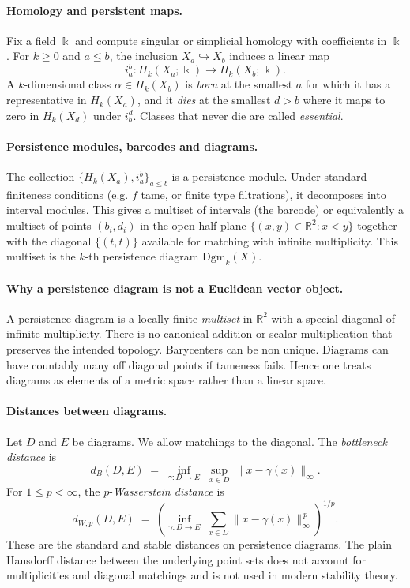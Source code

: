 \paragraph{Homology and persistent maps.}
Fix a field $\Bbbk$ and compute singular or simplicial homology with coefficients in $\Bbbk$. For $k\ge 0$ and $a\le b$, the inclusion $X_a \hookrightarrow X_b$ induces a linear map
\begin{equation}
i_{a}^{b}: H_k(X_a;\Bbbk) \longrightarrow H_k(X_b;\Bbbk).
\end{equation}
A $k$-dimensional class $\alpha\in H_k(X_b)$ is \emph{born} at the smallest $a$ for which it has a representative in $H_k(X_a)$, and it \emph{dies} at the smallest $d>b$ where it maps to zero in $H_k(X_d)$ under $i_{b}^{d}$. Classes that never die are called \emph{essential}.

\paragraph{Persistence modules, barcodes and diagrams.}
The collection $\{H_k(X_a), i_{a}^{b}\}_{a\le b}$ is a persistence module. Under standard finiteness conditions (e.g. $f$ tame, or finite type filtrations), it decomposes into interval modules. This gives a multiset of intervals (the barcode) or equivalently a multiset of points $(b_i,d_i)$ in the open half plane $\{(x,y)\in\mathbb{R}^2: x<y\}$ together with the diagonal $\{(t,t)\}$ available for matching with infinite multiplicity. This multiset is the $k$-th persistence diagram $\mathrm{Dgm}_k(X)$.

\paragraph{Why a persistence diagram is not a Euclidean vector object.}
A persistence diagram is a locally finite \emph{multiset} in $\mathbb{R}^2$ with a special diagonal of infinite multiplicity. There is no canonical addition or scalar multiplication that preserves the intended topology. Barycenters can be non unique. Diagrams can have countably many off diagonal points if tameness fails. Hence one treats diagrams as elements of a metric space rather than a linear space.

\paragraph{Distances between diagrams.}
Let $D$ and $E$ be diagrams. We allow matchings to the diagonal. The \emph{bottleneck distance} is
\begin{equation}
d_B(D,E) \;=\; \inf_{\gamma:D\to E} \; \sup_{x\in D} \, \lVert x - \gamma(x) \rVert_{\infty}.
\end{equation}
For $1\le p<\infty$, the $p$-\emph{Wasserstein distance} is
\begin{equation}
d_{W,p}(D,E) \;=\; \left( \inf_{\gamma:D\to E} \; \sum_{x\in D} \lVert x - \gamma(x) \rVert_{\infty}^{\,p} \right)^{1/p}.
\end{equation}
These are the standard and stable distances on persistence diagrams. The plain Hausdorff distance between the underlying point sets does not account for multiplicities and diagonal matchings and is not used in modern stability theory.

